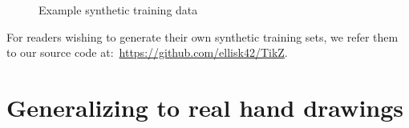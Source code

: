\documentclass{article}
\begin{document}
\begin{figure}
      \begin{minipage}[t]{2.2cm}\end{minipage}
      \begin{minipage}[t]{2.2cm}\end{minipage}
      \begin{minipage}[t]{2.2cm}\end{minipage}
      \begin{minipage}[t]{2.2cm}\end{minipage}
      \begin{minipage}[t]{2.2cm}\end{minipage}
      \caption{Example synthetic training data}\label{exampleTrainingData}
\end{figure}

For readers wishing to generate their own synthetic training sets,
we refer them to our source code at:~\url{https://github.com/ellisk42/TikZ}.


\section{Generalizing to real hand drawings}
\end{document}
